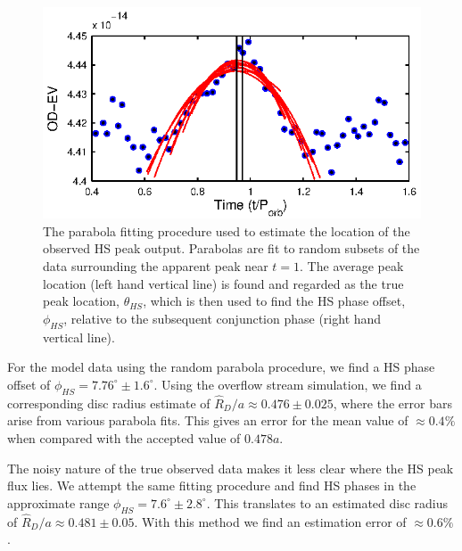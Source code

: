 \documentclass[preprint2]{aastex}
\begin{document}
\begin{figure}[t]
\centering
\includegraphics[width=\columnwidth]{./AMCVn_parabolas.eps}
\caption{The parabola fitting procedure used to estimate the location of the observed HS peak output. Parabolas are fit to random subsets of the data surrounding the apparent peak near $ t=1 $. The average peak location (left hand vertical line) is found and regarded as the true peak location, $ \theta_{HS} $, which is then used to find the HS phase offset, $ \phi_{HS} $, relative to the subsequent conjunction phase (right hand vertical line).}
\label{fig.parabolas}
\end{figure}

For the model data using the random parabola procedure, we find a HS phase offset of $\phi_{HS} = 7.76^{\circ} \pm 1.6^{\circ}$. Using the overflow stream simulation, we find a corresponding disc radius estimate of $\hat{R}_D/a \approx 0.476 \pm 0.025$, where the error bars arise from various parabola fits. This gives an error for the mean value of $\approx 0.4 \%$ when compared with the accepted value of $0.478a$.

The noisy nature of the true observed data makes it less clear where the HS peak flux lies. We attempt the same fitting procedure and find HS phases in the approximate range $\phi_{HS} = 7.6^{\circ} \pm 2.8^{\circ}$. This translates to an estimated disc radius of $\hat{R}_D/a \approx 0.481 \pm 0.05$. With this method we find an estimation error of $\approx 0.6\%$.


\end{document}
